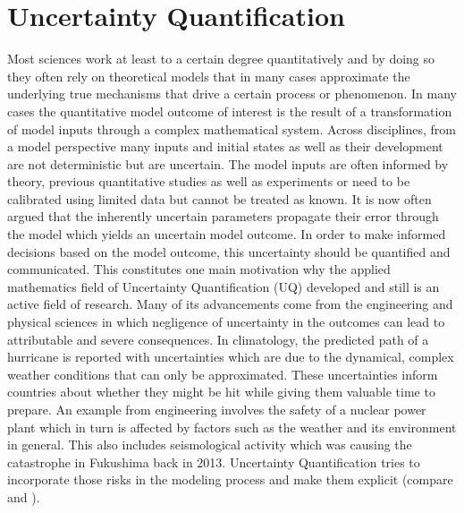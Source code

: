 \section{Uncertainty Quantification}
\thispagestyle{plain} %

Most sciences work at least to a certain degree quantitatively and by doing so they often rely on theoretical models that in many cases approximate the underlying true mechanisms that drive a certain process or phenomenon. In many cases the quantitative model outcome of interest is the result of a transformation of model inputs through a complex mathematical system. Across disciplines, from a model perspective many inputs and initial states as well as their development are not deterministic but are uncertain. The model inputs are often informed by theory, previous quantitative studies as well as experiments or need to be calibrated using limited data but cannot be treated as known. It is now often argued that the inherently uncertain parameters propagate their error through the model which yields an uncertain model outcome. In order to make informed decisions based on the model outcome, this uncertainty should be quantified and communicated. This constitutes one main motivation why the applied mathematics field of Uncertainty Quantification (UQ) developed and still is an active field of research. Many of its advancements come from the engineering and physical sciences in which negligence of uncertainty in the outcomes can lead to attributable and severe consequences. In climatology, the predicted path of a hurricane is reported with uncertainties which are due to the dynamical, complex weather conditions that can only be approximated. These uncertainties inform countries about whether they might be hit while giving them valuable time to prepare. An example from engineering involves the safety of a nuclear power plant which in turn is affected by factors such as the weather and its environment in general. This also includes seismological activity which was causing the catastrophe in Fukushima back in 2013. Uncertainty Quantification tries to incorporate those risks in the modeling process and make them explicit (compare \cite{Sullivan.2015} and \cite{Smith.2013}).

